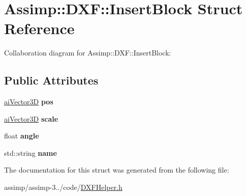 \hypertarget{struct_assimp_1_1_d_x_f_1_1_insert_block}{\section{Assimp\+:\+:D\+X\+F\+:\+:Insert\+Block Struct Reference}
\label{struct_assimp_1_1_d_x_f_1_1_insert_block}
}


Collaboration diagram for Assimp\+:\+:D\+X\+F\+:\+:Insert\+Block\+:
\subsection*{Public Attributes}
\begin{DoxyCompactItemize}
\item 
\hypertarget{struct_assimp_1_1_d_x_f_1_1_insert_block_ad1e91056bf36f2c6b00249283a75f388}{\hyperlink{structai_vector3_d}{ai\+Vector3\+D} {\bfseries pos}}\label{struct_assimp_1_1_d_x_f_1_1_insert_block_ad1e91056bf36f2c6b00249283a75f388}

\item 
\hypertarget{struct_assimp_1_1_d_x_f_1_1_insert_block_ab9c574b10132b8dddd975af53ca74171}{\hyperlink{structai_vector3_d}{ai\+Vector3\+D} {\bfseries scale}}\label{struct_assimp_1_1_d_x_f_1_1_insert_block_ab9c574b10132b8dddd975af53ca74171}

\item 
\hypertarget{struct_assimp_1_1_d_x_f_1_1_insert_block_a32f8da3284726177d55cf227611d3cf6}{float {\bfseries angle}}\label{struct_assimp_1_1_d_x_f_1_1_insert_block_a32f8da3284726177d55cf227611d3cf6}

\item 
\hypertarget{struct_assimp_1_1_d_x_f_1_1_insert_block_a3f9f504a1ef94a6138c9c73523c4e7ad}{std\+::string {\bfseries name}}\label{struct_assimp_1_1_d_x_f_1_1_insert_block_a3f9f504a1ef94a6138c9c73523c4e7ad}

\end{DoxyCompactItemize}


The documentation for this struct was generated from the following file\+:\begin{DoxyCompactItemize}
\item 
assimp/assimp-\/3../code/\hyperlink{_d_x_f_helper_8h}{D\+X\+F\+Helper.\+h}\end{DoxyCompactItemize}
